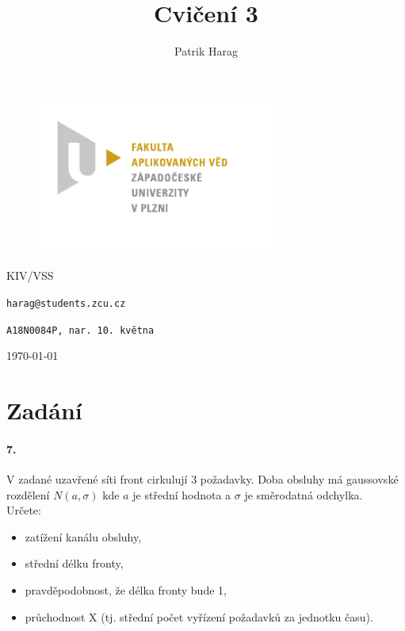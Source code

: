 \documentclass[12pt, a4paper]{article}
\title{Cvičení 3}
\author{Patrik Harag}
\makeatletter
\def \thesubtitle {KIV/VSS}
\def \theauthoremail {harag@students.zcu.cz}
\def \theauthorid {A18N0084P, nar. 10. května}
\makeatother
\begin{document}
\begin{titlepage}
	\begin{figure}
		\includegraphics[height=50mm]{img-fav-logo}
	\end{figure}
	
	\centering
	{\large \hspace{1mm} \par} %
	\vspace{15ex}
	
	{\huge\bfseries \thetitle \par}
	\vspace{2ex}
	{\scshape\Large \thesubtitle \par}
	\vspace{15ex}
	{\Large\itshape \theauthor \par}
	\vspace{2ex}
	{\texttt{\theauthoremail} \par}
	\vspace{1ex}
	{\texttt{\theauthorid} \par}
	
	\vfill

	{\today\par}
\end{titlepage}

\section*{Zadání}

\paragraph{7.}
V zadané uzavřené síti front cirkulují 3 požadavky. Doba obsluhy má gaussovské rozdělení $N(a , \sigma)$ kde $a$ je střední hodnota a $\sigma$ je směrodatná odchylka. \\

\noindent
Určete:
\begin{itemize}
	\item zatížení kanálu obsluhy,
	\item střední délku fronty,
	\item pravděpodobnost, že délka fronty bude 1,
	\item průchodnost X (tj. střední počet vyřízení požadavků za jednotku času).
\end{itemize}
\end{document}
